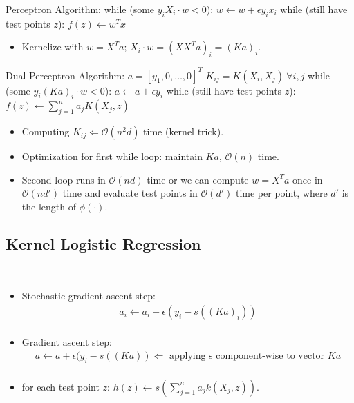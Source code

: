 \documentclass[10pt]{article}
\begin{document}
\begin{codeblock}
	Perceptron Algorithm:
	    while (some $y_{i}X_{i} \cdot w < 0$):
	        $w \leftarrow w + \epsilon y_{i}x_{i}$
	    while (still have test points $z$):
	        $f(z) \leftarrow w^{T}x$
\end{codeblock}
		\begin{itemize}
		\item Kernelize with $w=X^{T}a$; $X_{i}\cdot w = (XX^{T}a)_{i} = (Ka)_{i}$.
		\end{itemize}

\begin{codeblock}
	Dual Perceptron Algorithm:
	    $a = [y_{1}, 0, \dots, 0]^{T}$
	    $K_{ij} = K(X_{i}, X_{j}) \ \forall i,j$
	    while (some $y_{i}(Ka)_{i} \cdot w < 0$):
	        $a \leftarrow a + \epsilon y_{i}$
	    while (still have test points $z$):
	        $f(z) \leftarrow \sum_{j=1}^{n} a_{j}K(X_{j},z)$
\end{codeblock}
		\begin{itemize}
		\item Computing $K_{ij} \Leftarrow \mathcal{O}(n^{2}d)$ time (kernel trick).
		\item Optimization for first while loop: maintain $Ka$, $\mathcal{O}(n)$ time.
		\item Second loop runs in $\mathcal{O}(nd)$ time or we can compute $w=X^{T}a$ once in $\mathcal{O}(nd')$ time and evaluate test points in $\mathcal{O}(d')$ time per point, where $d'$ is the length of $\phi(\cdot)$.
	\end{itemize}

	\subsection*{Kernel Logistic Regression}
	\
	\begin{itemize}
		\item Stochastic gradient ascent step:
			\begin{align*}
				a_{i} \leftarrow a_{i} + \epsilon(y_{i} - s((Ka)_{i}))\\
			\end{align*}
		\item Gradient ascent step:
			\begin{align*}
				a \leftarrow a + \epsilon(y_{i} - s((Ka)) \Leftarrow \text{ applying s component-wise to vector } Ka \\
			\end{align*}	
		\item for each test point $z$: $h(z) \leftarrow s(\sum_{j=1}^{n} a_{j}k(X_{j}, z))$.
	\end{itemize}
	
\end{document}
